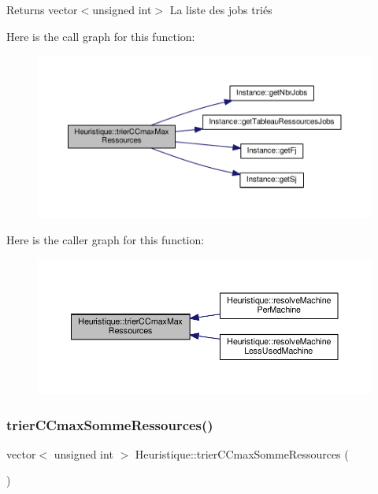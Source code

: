 \begin{DoxyReturn}{Returns}
vector$<$unsigned int$>$ La liste des jobs triés 
\end{DoxyReturn}
Here is the call graph for this function\+:\nopagebreak
\begin{figure}[H]
\begin{center}
\leavevmode
\includegraphics[width=350pt]{classHeuristique_a02aae5127f941e55311e8bbd3b4afd3c_cgraph}
\end{center}
\end{figure}
Here is the caller graph for this function\+:\nopagebreak
\begin{figure}[H]
\begin{center}
\leavevmode
\includegraphics[width=350pt]{classHeuristique_a02aae5127f941e55311e8bbd3b4afd3c_icgraph}
\end{center}
\end{figure}
\mbox{\label{classHeuristique_a38c390423fc2b190da599148ca879cd6}} 
\subsubsection{\texorpdfstring{trier\+C\+Cmax\+Somme\+Ressources()}{trierCCmaxSommeRessources()}}
{\footnotesize\ttfamily vector$<$ unsigned int $>$ Heuristique\+::trier\+C\+Cmax\+Somme\+Ressources (\begin{DoxyParamCaption}{ }\end{DoxyParamCaption})}



